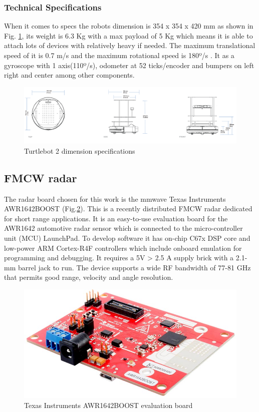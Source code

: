 \subsubsection*{Technical Specifications}
When it comes to specs the robots dimension is 354 x 354 x 420 mm as shown in Fig. \ref{fig::t2specs}, its weight is 6.3 Kg with a max payload of 5 Kg which means it is able to attach lots of devices with relatively heavy if needed. The maximum translational  speed of it is 0.7 m/s and the maximum rotational speed is 180º/s . It as a gyroscope with 1 axis(110º/s), odometer at 52 ticks/encoder and  bumpers on left right and center among other components. 

\begin{figure}[h] 
\centerline{\includegraphics [width=1.0 \textwidth]{imgs/chapter4/tspecs.png}}
\caption{Turtlebot 2 dimension specifications}
\label{fig::t2specs}
\end{figure}


\subsection{FMCW radar}
The radar board chosen for this work is the mmwave Texas Instruments AWR1642BOOST (Fig.\ref{fig:awr}). This is a recently distributed \ac{FMCW} radar dedicated for short range applications. It is an easy-to-use evaluation board for the AWR1642 automotive radar sensor which is connected to the micro-controller unit (MCU) LaunchPad. To develop software it has  on-chip C67x DSP core and low-power ARM Cortex-R4F controllers which include onboard emulation for programming and debugging.
It requires a 5V > 2.5 A supply brick with a 2.1-mm barrel jack to run.
The device supports a wide RF bandwidth of 77-81 GHz that permits good range, velocity  and angle resolution.

\begin{figure}[h] 
\centerline{\includegraphics [width=0.5 \textwidth]{imgs/chapter4/awr1642.jpg}}
\caption{Texas Instruments AWR1642BOOST evaluation board}
\label{fig:awr}
\end{figure}

